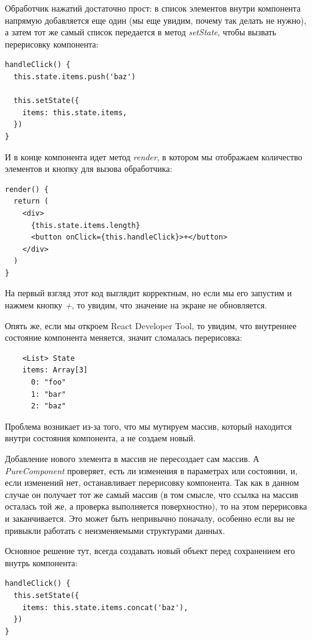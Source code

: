 Обработчик нажатий достаточно прост: в список элементов внутри компонента напрямую добавляется еще один (мы еще увидим, почему так делать не нужно), а затем тот же самый список передается в метод \textit{setState}, чтобы вызвать перерисовку компонента:

\begin{lstlisting}
handleClick() {
  this.state.items.push('baz')
  
  this.setState({
    items: this.state.items,
  })
}
\end{lstlisting}

И в конце компонента идет метод \textit{render}, в котором мы отображаем количество элементов и кнопку для вызова обработчика:

\begin{lstlisting}
render() {
  return (
    <div>
      {this.state.items.length}
      <button onClick={this.handleClick}>+</button>
    </div>
  )
}
\end{lstlisting}

На первый взгляд этот код выглядит корректным, но если мы его запустим и нажмем кнопку \textit{+}, то увидим, что значение на экране не обновляется.

Опять же, если мы откроем React Developer Tool, то увидим, что внутреннее состояние компонента меняется, значит сломалась перерисовка:

\begin{lstlisting}
    <List> State
    items: Array[3]
      0: "foo"
      1: "bar"
      2: "baz"
\end{lstlisting}

Проблема возникает из-за того, что мы мутируем массив, который находится внутри состояния компонента, а не создаем новый.

Добавление нового элемента в массив не пересоздает сам массив. А \textit{PureComponent} проверяет, есть ли изменения в параметрах или состоянии, и, если изменений нет, останавливает перерисовку компонента. Так как в данном случае он получает тот же самый массив (в том смысле, что ссылка на массив осталась той же, а проверка выполняется поверхностно), то на этом перерисовка и заканчивается. Это может быть непривычно поначалу, особенно если вы не привыкли работать с неизменяемыми структурами данных.

Основное решение тут, всегда создавать новый объект перед сохранением его внутрь компонента:

\begin{lstlisting}
handleClick() {
  this.setState({
    items: this.state.items.concat('baz'),
  })
}
\end{lstlisting}

